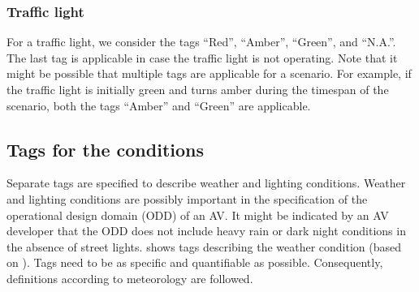 %

\subsubsection{Traffic light}
\label{sec:traffic light}

For a traffic light, we consider the tags ``Red'', ``Amber'', ``Green'', and ``N.A.''. The last tag is applicable in case the traffic light is not operating.
Note that it might be possible that multiple tags are applicable for a scenario. For example, if the traffic light is initially green and turns amber during the timespan of the scenario, both the tags ``Amber'' and ``Green'' are applicable.



\subsection{Tags for the conditions}
\label{sec:conditions}

Separate tags are specified to describe weather and lighting conditions. Weather and lighting conditions are possibly important in the specification of the operational design domain (ODD) of an AV. It might be indicated by an AV developer that the ODD does not include heavy rain or dark night conditions in the absence of street lights.  shows tags describing the weather condition (based on \cite{mahmassani2012use}). Tags need to be as specific and quantifiable as possible. Consequently, definitions according to meteorology are followed. 

